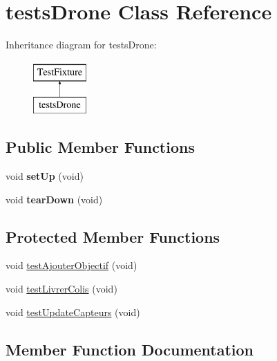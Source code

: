 \hypertarget{classtests_drone}{}\section{tests\+Drone Class Reference}
\label{classtests_drone}
Inheritance diagram for tests\+Drone\+:\begin{figure}[H]
\begin{center}
\leavevmode
\includegraphics[height=2.000000cm]{classtests_drone}
\end{center}
\end{figure}
\subsection*{Public Member Functions}
\begin{DoxyCompactItemize}
\item 
\mbox{\label{classtests_drone_a82cd9f57ec465b41c6f2eec9e1bf1930}} 
void {\bfseries set\+Up} (void)
\item 
\mbox{\label{classtests_drone_a89bb7ccbd1b705eb95c6efde0e4cc0cb}} 
void {\bfseries tear\+Down} (void)
\end{DoxyCompactItemize}
\subsection*{Protected Member Functions}
\begin{DoxyCompactItemize}
\item 
void \mbox{\hyperlink{classtests_drone_a76dff30c692b32cc783dc82029a7b6e8}{test\+Ajouter\+Objectif}} (void)
\item 
void \mbox{\hyperlink{classtests_drone_a61a34f9f1218e7b9fda75901a152208d}{test\+Livrer\+Colis}} (void)
\item 
void \mbox{\hyperlink{classtests_drone_a7e7114974f0c5d91f09b147277732bf3}{test\+Update\+Capteurs}} (void)
\end{DoxyCompactItemize}


\subsection{Member Function Documentation}
\mbox{\label{classtests_drone_a76dff30c692b32cc783dc82029a7b6e8}} 
